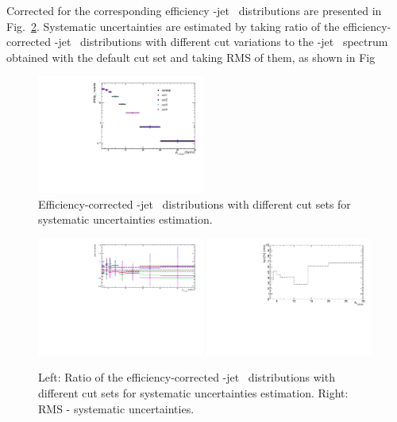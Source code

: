 Corrected for the corresponding efficiency \Dstar-jet \pt\ distributions are presented in Fig.~\ref{fig:JetPtSys}. Systematic uncertainties are estimated by taking ratio of the efficiency-corrected \Dstar-jet \pt\ distributions with different cut variations to the \Dstar-jet \pt\ spectrum obtained with the default cut set and taking RMS of them, as shown in Fig

\begin{figure}[bth]
\begin{center}
\includegraphics[width=0.49\textwidth]{pPbplots/jetSpectra/jetSpectra_pTD_pTD3}
\caption{Efficiency-corrected \Dstar-jet \pt\ distributions with different cut sets for systematic uncertainties estimation.} 
\label{fig:JetPtSys}
\end{center}
\end{figure}

\begin{figure}[bth]
\begin{center}
\includegraphics[width=0.49\textwidth]{pPbplots/jetSpectra/jetSpectraRatio_pTD_pTD3}
\includegraphics[width=0.49\textwidth]{pPbplots/jetSpectra/jetSpectraSys_pTD_pTD3}
\caption{Left: Ratio of the efficiency-corrected \Dstar-jet \pt\ distributions with different cut sets for systematic uncertainties estimation. Right: RMS - systematic uncertainties.} 
\label{fig:JetPtSys}
\end{center}
\end{figure}


